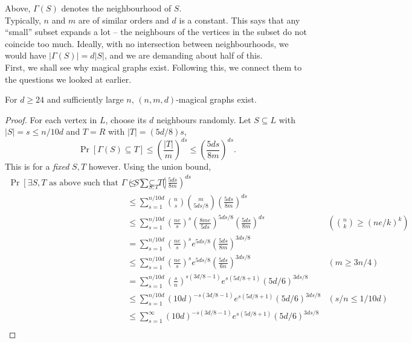 		Above, $\Gamma(S)$ denotes the neighbourhood of $S$.\\
		Typically, $n$ and $m$ are of similar orders and $d$ is a constant.
		This says that any ``small'' subset expands a lot -- the neighbours of the vertices in the subset do not coincide too much. Ideally, with no intersection between neighbourhoods, we would have $|\Gamma(S)| = d|S|$, and we are demanding about half of this.\\
		First, we shall see why magical graphs exist. Following this, we connect them to the questions we looked at earlier.\\

		\begin{ftheo}
			For $d\ge 24$ and sufficiently large $n$, $(n,m,d)$-magical graphs exist.
		\end{ftheo}
		\begin{proof}
			For each vertex in $L$, choose its $d$ neighbours randomly. Let $S \subseteq L$ with $|S| = s \le n/10d$ and $T = R$ with $|T| = (5d/8)s$,
			\[ \Pr\left[ \Gamma(S) \subseteq T \right] \le \left( \frac{|T|}{m} \right)^{ds} \le \left( \frac{5ds}{8m} \right)^{ds}. \]
			This is for a \emph{fixed} $S,T$ however. Using the union bound,
			\begin{align*}
				\Pr\left[ \text{$\exists S,T$ as above such that }\Gamma(S) \subseteq T \right] &\le \sum_{S,T} \left( \frac{5ds}{8m} \right)^{ds} \\
					&\le  \sum_{s=1}^{n/10d} \binom{n}{s} \binom{m}{5ds/8} \left(\frac{5ds}{8m}\right)^{ds} \\
					&\le \sum_{s=1}^{n/10d} \left(\frac{ne}{s}\right)^s \left(\frac{8me}{5ds}\right)^{5ds/8} \left( \frac{5ds}{8m} \right)^{ds} & \left(\binom{n}{k} \ge (ne/k)^k\right) \\ %
					&= \sum_{s=1}^{n/10d} \left( \frac{ne}{s} \right)^s e^{5ds/8} \left(\frac{5ds}{8m}\right)^{3ds/8} \\
					&\le \sum_{s=1}^{n/10d} \left( \frac{ne}{s} \right)^s e^{5ds/8} \left(\frac{5ds}{6n}\right)^{3ds/8} & (m\ge 3n/4) \\
					&= \sum_{s=1}^{n/10d} \left(\frac{s}{n}\right)^{s(3d/8 - 1)} e^{s(5d/8+1)} \left(5d/6\right)^{3ds/8} \\
					&\le \sum_{s=1}^{n/10d}  (10d)^{-s(3d/8-1)} e^{s(5d/8+1)} \left(5d/6\right)^{3ds/8} & (s/n \le 1/10d) \\
					&\le \sum_{s=1}^{\infty}  (10d)^{-s(3d/8-1)} e^{s(5d/8+1)} \left(5d/6\right)^{3ds/8} \\

\end{align*}
\end{proof}
